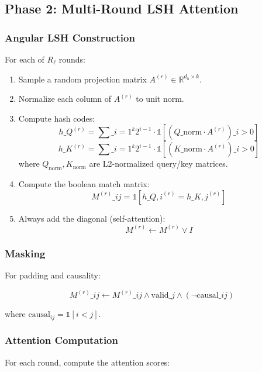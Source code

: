 \subsection{Phase 2: Multi-Round LSH Attention}

\subsubsection{Angular LSH Construction}

For each of $R_\ell$ rounds:

\begin{enumerate}
\item Sample a random projection matrix $A^{(r)} \in \mathbb{R}^{d_h \times k}$.
\item Normalize each column of $A^{(r)}$ to unit norm.
\item Compute hash codes:
  $$
  h\_Q^{(r)} = \sum\_{i=1}^{k} 2^{i-1} \cdot \mathbb{1}\left[\left(Q\_\text{norm} \cdot A^{(r)}\right)\_i > 0\right]
  \tag{4.14}
  $$
  $$
  h\_K^{(r)} = \sum\_{i=1}^{k} 2^{i-1} \cdot \mathbb{1}\left[\left(K\_\text{norm} \cdot A^{(r)}\right)\_i > 0\right]
  \tag{4.15}
  $$
  where $Q_\text{norm}, K_\text{norm}$ are L2-normalized query/key matrices.

\item Compute the boolean match matrix:
  $$
  M^{(r)}\_{ij} = \mathbb{1}[h\_{Q,i}^{(r)} = h\_{K,j}^{(r)}]
  \tag{4.16}
  $$

\item Always add the diagonal (self-attention):
  $$
  M^{(r)} \leftarrow M^{(r)} \lor I
  \tag{4.17}
  $$

\end{enumerate}
\subsubsection{Masking}

For padding and causality:

\[
M^{(r)}\_{ij} \leftarrow M^{(r)}\_{ij} \land \text{valid}\_j \land (\neg \text{causal}\_{ij})
\tag{4.18}
\]

where $\text{causal}_{ij} = \mathbb{1}[i < j]$.

\subsubsection{Attention Computation}

For each round, compute the attention scores:

